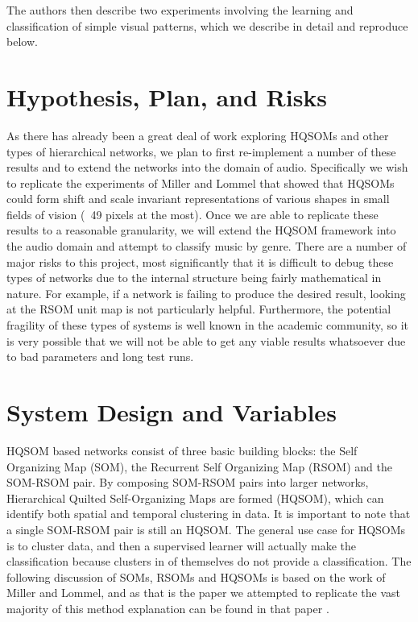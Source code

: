 \documentclass[a4paper,10pt]{article}
\begin{document}
The authors then describe two experiments involving the learning and classification of simple visual
patterns, which we describe in detail and reproduce below.

\section{Hypothesis, Plan, and Risks}
As there has already been a great deal of work exploring HQSOMs and other types of hierarchical
networks, we plan to first re-implement a number of these results and to extend the networks
into the domain of audio.  Specifically we wish to replicate the experiments of Miller and Lommel
that showed that HQSOMs could form shift and scale invariant representations of various shapes in
small fields of vision (~49 pixels at the most).  Once we are able to replicate these results to a
reasonable granularity, we will extend the HQSOM framework into the audio domain and attempt to
classify music by genre.  There are a number of major risks to this project, most significantly
that it is difficult to debug these types of networks due to the internal structure being fairly
mathematical in nature.  For example, if a network is failing to produce the desired result,
looking at the RSOM unit map is not particularly helpful.  Furthermore, the potential fragility of
these types of systems is well known in the academic community, so it is very possible that we will
not be able to get any viable results whatsoever due to bad parameters and long test runs.

\section{System Design and Variables}
HQSOM based networks consist of three basic building blocks: the Self Organizing Map (SOM), the
Recurrent Self Organizing Map (RSOM) and the SOM-RSOM pair.  By composing SOM-RSOM pairs
into larger networks, Hierarchical Quilted Self-Organizing Maps are formed (HQSOM), which can
identify both spatial and temporal clustering in data.  It is important to note that a single
SOM-RSOM pair is still an HQSOM. The general use case for HQSOMs is to cluster data, and then a
supervised learner will actually make the classification because clusters in of themselves do not
provide a classification. The following discussion of SOMs, RSOMs and HQSOMs is based on the work of
Miller and Lommel, and as that is the paper we attempted to replicate the vast majority of this
method explanation can be found in that paper \cite{HQSOM}.
\end{document}

